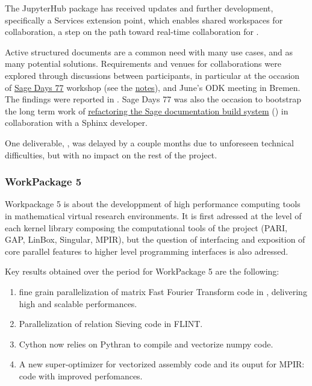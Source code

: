 \documentclass{deliverablereport}
\begin{document}
  The JupyterHub package has received updates and further development, specifically a
  Services extension point, which enables shared workspaces for collaboration, a step on
  the path toward real-time collaboration for .

  Active structured documents are a common need with many use cases, and as many potential
  solutions. Requirements and venues for collaborations were explored through discussions
  between participants, in particular at the occasion of
  \href{https://wiki.sagemath.org/days77/}{Sage Days 77} workshop (see the
  \href{https://wiki.sagemath.org/days77/live-structured-documents}{notes}), and June's
  ODK meeting in Bremen. The findings were reported in . Sage Days 77
  was also the occasion to bootstrap the long term work of
  \href{https://wiki.sagemath.org/days77/documentation}{refactoring the Sage documentation
    build system} () in collaboration with a Sphinx developer.

  One deliverable, , was delayed by a couple months due to
  unforeseen technical difficulties, but with no impact on the rest of the project.


  \subsubsection{WorkPackage 5}

  Workpackage 5 is about the developpment of high performance computing tools in
  mathematical virtual research environments. It is first adressed at the level
  of each kernel library composing the computational tools of the project (PARI,
  GAP, LinBox, Singular, MPIR), but the question of interfacing and exposition
  of core parallel features to higher level programming interfaces is also
  adressed.
  

  Key results obtained over the period for WorkPackage 5 are the following:
  \begin{enumerate}
  \item fine grain parallelization of matrix Fast Fourier Transform code in
    \FLINT, delivering high and scalable performances.
  \item Parallelization of  relation  Sieving code in FLINT.
  \item Cython now relies on Pythran to compile and vectorize numpy code.
  \item A new super-optimizer for vectorized assembly code and its ouput for MPIR: code with improved perfomances.
  \end{enumerate}
\end{document}
